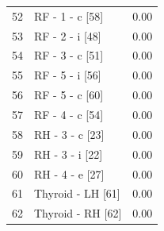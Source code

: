 \documentclass[11pt,a4paper]{article}
\begin{document}
\begin{longtable}{@{}rlr@{}}
    52 & RF - 1 - c [58] & 0.00 \\
    53 & RF - 2 - i [48] & 0.00 \\
    54 & RF - 3 - c [51] & 0.00 \\
    55 & RF - 5 - i [56] & 0.00 \\
    56 & RF - 5 - c [60] & 0.00 \\
    57 & RF - 4 - c [54] & 0.00 \\
    58 & RH - 3 - c [23] & 0.00 \\
    59 & RH - 3 - i [22] & 0.00 \\
    60 & RH - 4 - e [27] & 0.00 \\
    61 & Thyroid - LH [61] & 0.00 \\
    62 & Thyroid - RH [62] & 0.00 \\
\end{longtable}
\end{document}
